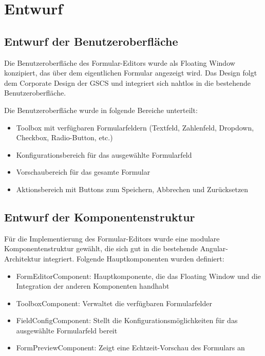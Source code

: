 \documentclass[a4paper,11pt]{article}
\begin{document}
\section{Entwurf}

\subsection{Entwurf der Benutzeroberfläche}

Die Benutzeroberfläche des Formular-Editors wurde als Floating Window konzipiert, das über dem eigentlichen Formular angezeigt wird. Das Design folgt dem Corporate Design der GSCS und integriert sich nahtlos in die bestehende Benutzeroberfläche.

Die Benutzeroberfläche wurde in folgende Bereiche unterteilt:

\begin{itemize}
\item Toolbox mit verfügbaren Formularfeldern (Textfeld, Zahlenfeld, Dropdown, Checkbox, Radio-Button, etc.)
\item Konfigurationsbereich für das ausgewählte Formularfeld
\item Vorschaubereich für das gesamte Formular
\item Aktionsbereich mit Buttons zum Speichern, Abbrechen und Zurücksetzen
\end{itemize}

\subsection{Entwurf der Komponentenstruktur}

Für die Implementierung des Formular-Editors wurde eine modulare Komponentenstruktur gewählt, die sich gut in die bestehende Angular-Architektur integriert. Folgende Hauptkomponenten wurden definiert:

\begin{itemize}
\item FormEditorComponent: Hauptkomponente, die das Floating Window und die Integration der anderen Komponenten handhabt
\item ToolboxComponent: Verwaltet die verfügbaren Formularfelder
\item FieldConfigComponent: Stellt die Konfigurationsmöglichkeiten für das ausgewählte Formularfeld bereit
\item FormPreviewComponent: Zeigt eine Echtzeit-Vorschau des Formulars an
\end{itemize}
\end{document}
